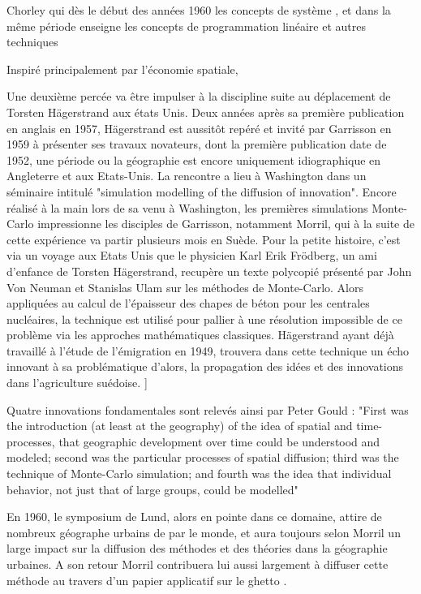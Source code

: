 {%
Chorley qui dès le début des années 1960 les concepts de système  \autocite{Johnston2004} , et dans la même période enseigne les concepts de programmation linéaire et autres techniques \autocite{Haggett1969}

Inspiré principalement par l'économie spatiale, %

Une deuxième percée va être impulser à la discipline suite au déplacement de Torsten Hägerstrand aux états Unis.  Deux années après sa première publication en anglais en 1957, Hägerstrand est aussitôt repéré et invité par Garrisson en 1959 à présenter ses travaux novateurs, dont la première publication date de 1952, une période ou la géographie est encore uniquement idiographique en Angleterre et aux Etats-Unis. La rencontre a lieu à Washington dans un séminaire intitulé "simulation modelling of the diffusion of innovation". Encore réalisé à la main lors de sa venu à Washington, les premières simulations Monte-Carlo impressionne les disciples de Garrisson, notamment Morril, qui à la suite de cette expérience va partir plusieurs mois en Suède\autocite{Morril2005}. Pour la petite histoire, c'est via un voyage aux Etats Unis que le physicien Karl Erik Frödberg, un ami d'enfance de Torsten Hägerstrand, recupère un texte polycopié présenté par John Von Neuman et Stanislas Ulam sur les méthodes de Monte-Carlo. Alors appliquées au calcul de l'épaisseur des chapes de béton pour les centrales nucléaires, la technique est utilisé pour pallier à une résolution impossible de ce problème via les approches mathématiques classiques. Hägerstrand ayant déjà travaillé à l'étude de l'émigration en 1949, trouvera dans cette technique un écho innovant à sa problématique d'alors, la propagation des idées et des innovations dans l'agriculture suédoise. \autocite[26-28]{Gould2004}]

Quatre innovations fondamentales sont relevés ainsi par Peter Gould : "First was the introduction (at least at the geography) of the idea of spatial and time-processes, that geographic development over time could be understood and modeled; second was the particular processes of spatial diffusion; third was the technique of Monte-Carlo simulation; and fourth was the idea that individual behavior, not just that of large groups, could be modelled"

En 1960, le symposium de Lund, alors en pointe dans ce domaine, attire de nombreux géographe urbains de par le monde, et aura toujours selon Morril un large impact sur la diffusion des méthodes et des théories dans la géographie urbaines. A son retour Morril contribuera lui aussi largement à diffuser cette méthode au travers d'un papier applicatif sur le ghetto \autocite{Morril1965}. 

}
